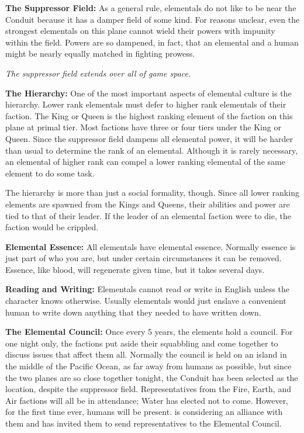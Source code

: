 \documentclass[blue]{elementals}
\begin{document}
{\bf The Suppressor Field:}
As a general rule, elementals do not like to be near the Conduit because it has a damper field of some kind. For reasons unclear, even the strongest elementals on this plane cannot wield their powers with impunity within the field. Powers are so dampened, in fact, that an elemental and a human might be nearly equally matched in fighting prowess.

\emph{The suppressor field extends over all of game space.}

{\bf The Hierarchy:}
One of the most important aspects of elemental culture is the hierarchy. Lower rank elementals must defer to higher rank elementals of their faction. The King or Queen is the highest ranking element of the faction on this plane at primal tier. Most factions have three or four tiers under the King or Queen.  Since the suppressor field dampens all elemental power, it will be harder than usual to determine the rank of an elemental. Although it is rarely necessary, an elemental of higher rank can compel a lower ranking elemental of the same element to do some task.

The hierarchy is more than just a social formality, though. Since all lower ranking elements are spawned from the Kings and Queens, their abilities and power are tied to that of their leader. If the leader of an elemental faction were to die, the faction would be crippled.


{\bf Elemental Essence:}
All elementals have elemental essence. Normally essence is just part of who you are, but under certain circumstances it can be removed. Essence, like blood, will regenerate given time, but it takes several days.

{\bf Reading and Writing:}
Elementals cannot read or write in English unless the character knows otherwise. Usually elementals would just enslave a convenient human to write down anything that they needed to have written down.

{\bf The Elemental Council:}
Once every 5 years, the elements hold a council. For one night only, the factions put aside their squabbling and come together to discuss issues that affect them all. Normally the council is held on an island in the middle of the Pacific Ocean, as far away from humans as possible, but since the two planes are so close together tonight, the Conduit has been selected as the location, despite the suppressor field.  Representatives from the Fire, Earth, and Air factions will all be in attendance; Water has elected not to come.  However, for the first time ever, humans will be present.  \cKing{} is considering an alliance with them and has invited them to send representatives to the Elemental Council.
\end{document}
